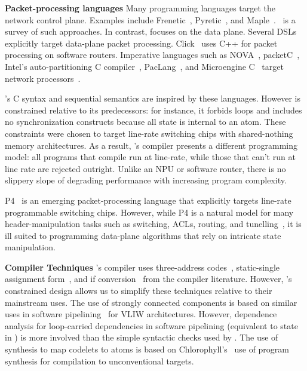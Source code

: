 \textbf{Packet-processing languages}
Many programming languages target the network control plane. Examples include
Frenetic~\cite{frenetic}, Pyretic~\cite{pyretic}, and
Maple~\cite{maple}.~\cite{language_survey} is a survey of such approaches.  In
contrast, \pktlanguage focuses on the data plane. Several DSLs explicitly
target data-plane packet processing. Click~\cite{click} uses C++ for packet
processing on software routers. Imperative languages such as NOVA~\cite{nova},
packetC~\cite{packetc}, Intel's auto-partitioning C
compiler~\cite{intel_uiuc_pldi}, PacLang~\cite{paclang_lang,
paclang_partitioner}, and Microengine C~\cite{microenginec, intel_ixa} target
network processors~\cite{ixp2800, ixp4xx}.

\pktlanguage's C syntax and sequential semantics are inspired by these
languages. However \pktlanguage is constrained relative to its predecessors:
for instance, it forbids loops and includes no synchronization constructs
because all state is internal to an atom. These constraints were chosen to
target line-rate switching chips with shared-nothing memory architectures. As a
result, \pktlanguage's compiler presents a different programming model: all
\pktlanguage programs that compile run at line-rate, while those that can't run
at line rate are rejected outright. Unlike an NPU or software router, there is
no slippery slope of degrading performance with increasing program complexity.

P4~\cite{p4} is an emerging packet-processing language that explicitly targets
line-rate programmable switching chips. However, while P4 is a natural model
for many header-manipulation tasks such as switching, ACLs, routing, and
tunelling~\cite{dc_p4}, it is ill suited to programming data-plane algorithms that
rely on intricate state manipulation.

\textbf{Compiler Techniques}
\pktlanguage's compiler uses three-address codes~\cite{tac}, static-single
assignment form~\cite{ssa}, and if conversion~\cite{if_conversion} from the
compiler literature. However, \pktlanguage's constrained design allows us to
simplify these techniques relative to their mainstream uses.  The use of
strongly connected components is based on similar uses in software
pipelining~\cite{software_pipelining} for VLIW architectures. However,
dependence analysis for loop-carried dependencies in software pipelining
(equivalent to state in \pktlanguage) is more involved than the simple
syntactic checks used by \pktlanguage. The use of synthesis to map codelets to
atoms is based on Chlorophyll's~\cite{chlorophyll} use of program synthesis for
compilation to unconventional targets.

